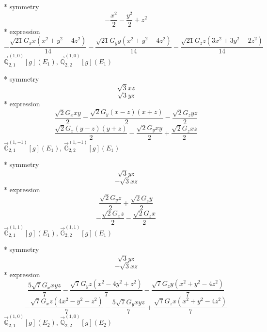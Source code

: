 \documentclass[fleqn,8pt]{jsarticle}
\begin{document}
\noindent\quad ** symmetry
\begin{dmath*}
- \frac{x^{2}}{2} - \frac{y^{2}}{2} + z^{2}
\end{dmath*}
\noindent\quad ** expression
\begin{dmath*}
- \frac{\sqrt{21} G_{x} x \left(x^{2} + y^{2} - 4 z^{2}\right)}{14} - \frac{\sqrt{21} G_{y} y \left(x^{2} + y^{2} - 4 z^{2}\right)}{14} - \frac{\sqrt{21} G_{z} z \left(3 x^{2} + 3 y^{2} - 2 z^{2}\right)}{14}
\end{dmath*}
\noindent\quad $\vec{\mathbb{Q}}_{2,1}^{(1,0)}[g](E_{1})$, $\vec{\mathbb{Q}}_{2,2}^{(1,0)}[g](E_{1})$

\noindent\quad ** symmetry
\begin{dmath*}
\sqrt{3} x z
\end{dmath*}
\begin{dmath*}
\sqrt{3} y z
\end{dmath*}
\noindent\quad ** expression
\begin{dmath*}
\frac{\sqrt{2} G_{x} x y}{2} - \frac{\sqrt{2} G_{y} \left(x - z\right) \left(x + z\right)}{2} - \frac{\sqrt{2} G_{z} y z}{2}
\end{dmath*}
\begin{dmath*}
\frac{\sqrt{2} G_{x} \left(y - z\right) \left(y + z\right)}{2} - \frac{\sqrt{2} G_{y} x y}{2} + \frac{\sqrt{2} G_{z} x z}{2}
\end{dmath*}
\noindent\quad $\vec{\mathbb{G}}_{2,1}^{(1,-1)}[g](E_{1})$, $\vec{\mathbb{G}}_{2,2}^{(1,-1)}[g](E_{1})$

\noindent\quad ** symmetry
\begin{dmath*}
\sqrt{3} y z
\end{dmath*}
\begin{dmath*}
- \sqrt{3} x z
\end{dmath*}
\noindent\quad ** expression
\begin{dmath*}
\frac{\sqrt{2} G_{y} z}{2} + \frac{\sqrt{2} G_{z} y}{2}
\end{dmath*}
\begin{dmath*}
- \frac{\sqrt{2} G_{x} z}{2} - \frac{\sqrt{2} G_{z} x}{2}
\end{dmath*}
\noindent\quad $\vec{\mathbb{G}}_{2,1}^{(1,1)}[g](E_{1})$, $\vec{\mathbb{G}}_{2,2}^{(1,1)}[g](E_{1})$

\noindent\quad ** symmetry
\begin{dmath*}
\sqrt{3} y z
\end{dmath*}
\begin{dmath*}
- \sqrt{3} x z
\end{dmath*}
\noindent\quad ** expression
\begin{dmath*}
\frac{5 \sqrt{7} G_{x} x y z}{7} - \frac{\sqrt{7} G_{y} z \left(x^{2} - 4 y^{2} + z^{2}\right)}{7} - \frac{\sqrt{7} G_{z} y \left(x^{2} + y^{2} - 4 z^{2}\right)}{7}
\end{dmath*}
\begin{dmath*}
- \frac{\sqrt{7} G_{x} z \left(4 x^{2} - y^{2} - z^{2}\right)}{7} - \frac{5 \sqrt{7} G_{y} x y z}{7} + \frac{\sqrt{7} G_{z} x \left(x^{2} + y^{2} - 4 z^{2}\right)}{7}
\end{dmath*}
\noindent\quad $\vec{\mathbb{Q}}_{2,1}^{(1,0)}[g](E_{2})$, $\vec{\mathbb{Q}}_{2,2}^{(1,0)}[g](E_{2})$
\end{document}
